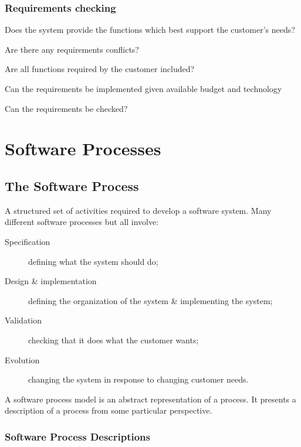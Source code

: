 \documentclass{report}
\newcommand{\textr}[1]{\textcolor{red}{#1}}
\begin{document}
\subsection{Requirements checking}
\begin{description}[style=multiline,leftmargin=8em]
  \item [\textr{Validity}] Does the system provide the functions which best support
the customer's needs?
  \item [\textr{Consistency}] Are there any requirements conflicts?
  \item [\textr{Completeness}] Are all functions required by the customer included?
  \item [\textr{Realism}] Can the requirements be implemented given available budget
and technology
  \item [\textr{Verifiability}] Can the requirements be checked?
\end{description}



\chapter{Software Processes}
\section{The Software Process}
A structured set of activities required to develop a software system.\newline
Many different software processes but all involve:
\begin{description}
  \item [Specification] defining what the system should do;
  \item [Design \& implementation] defining the organization of the
system \& implementing the system;
  \item [Validation] checking that it does what the customer wants;
  \item [Evolution] changing the system in response to changing
customer needs.
\end{description}
A software process model is an abstract representation of a process. It presents a description of a process from some particular perspective.

\subsection{Software Process Descriptions}
\end{document}
